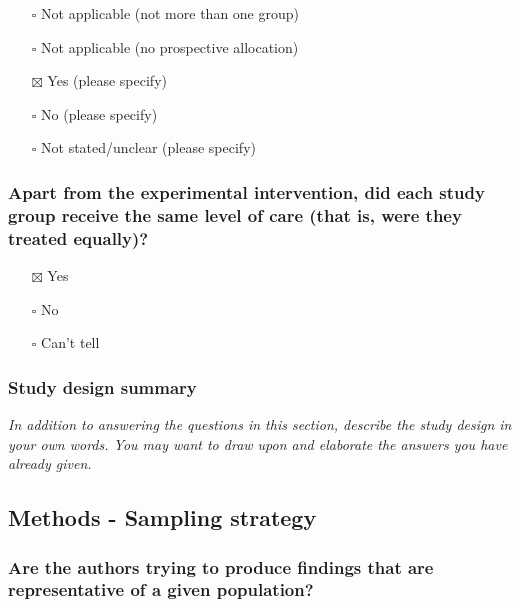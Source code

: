 \documentclass[
  doc, a4paper]{apa7}
\providecommand{\tightlist}{%
  \setlength{\itemsep}{0pt}\setlength{\parskip}{0pt}}
\begin{document}
\begin{itemize}
\tightlist
\item[$\square$]
  Not applicable (not more than one group)\\
\item[$\square$]
  Not applicable (no prospective allocation)\\
\item[$\boxtimes$]
  Yes (please specify)\\
\item[$\square$]
  No (please specify)\\
\item[$\square$]
  Not stated/unclear (please specify)
\end{itemize}

\subsubsection{Apart from the experimental intervention, did each study group receive the same level of care (that is, were they treated equally)?}\label{apart-from-the-experimental-intervention-did-each-study-group-receive-the-same-level-of-care-that-is-were-they-treated-equally}

\begin{itemize}
\tightlist
\item[$\boxtimes$]
  Yes
\item[$\square$]
  No
\item[$\square$]
  Can't tell
\end{itemize}

\subsubsection{Study design summary}\label{study-design-summary}

\emph{In addition to answering the questions in this section, describe the study design in your own words. You may want to draw upon and elaborate the answers you have already given.}

\subsection{Methods - Sampling strategy}\label{methods---sampling-strategy}

\subsubsection{Are the authors trying to produce findings that are representative of a given population?}\label{are-the-authors-trying-to-produce-findings-that-are-representative-of-a-given-population}
\end{document}
